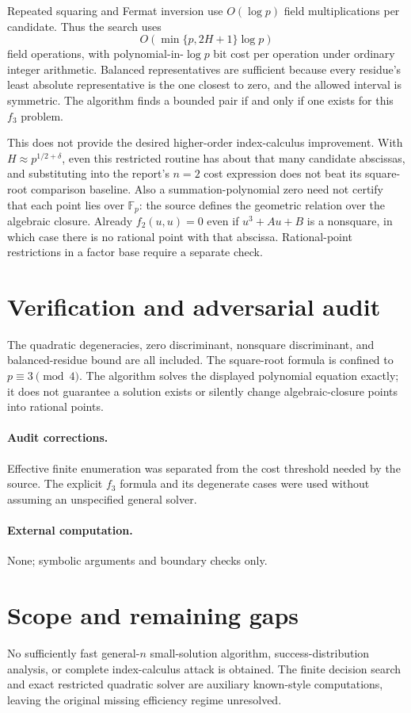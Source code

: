 \documentclass[11pt]{article}
\begin{document}
Repeated squaring and Fermat inversion use $O(\log p)$ field multiplications per candidate. Thus the search uses
\[
 O(\min\{p,2H+1\}\log p)
\]
field operations, with polynomial-in-$\log p$ bit cost per operation under ordinary integer arithmetic. Balanced representatives are sufficient because every residue's least absolute representative is the one closest to zero, and the allowed interval is symmetric. The algorithm finds a bounded pair if and only if one exists for this $f_3$ problem.

This does not provide the desired higher-order index-calculus improvement. With $H\approx p^{1/2+\delta}$, even this restricted routine has about that many candidate abscissas, and substituting into the report's $n=2$ cost expression does not beat its square-root comparison baseline. Also a summation-polynomial zero need not certify that each point lies over $\mathbb F_p$: the source defines the geometric relation over the algebraic closure. Already $f_2(u,u)=0$ even if $u^3+Au+B$ is a nonsquare, in which case there is no rational point with that abscissa. Rational-point restrictions in a factor base require a separate check.
\section{Verification and adversarial audit}
The quadratic degeneracies, zero discriminant, nonsquare discriminant, and balanced-residue bound are all included. The square-root formula is confined to $p\equiv3\pmod4$. The algorithm solves the displayed polynomial equation exactly; it does not guarantee a solution exists or silently change algebraic-closure points into rational points.
\paragraph{Audit corrections.} Effective finite enumeration was separated from the cost threshold needed by the source. The explicit $f_3$ formula and its degenerate cases were used without assuming an unspecified general solver.
\paragraph{External computation.} None; symbolic arguments and boundary checks only.
\section{Scope and remaining gaps}
No sufficiently fast general-$n$ small-solution algorithm, success-distribution analysis, or complete index-calculus attack is obtained. The finite decision search and exact restricted quadratic solver are auxiliary known-style computations, leaving the original missing efficiency regime unresolved.
\end{document}
